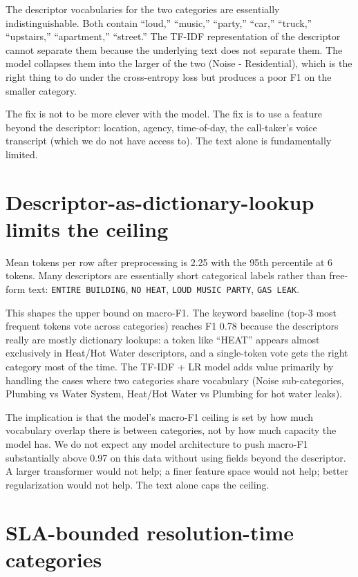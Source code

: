 \documentclass[11pt,letterpaper]{book}
\begin{document}
The descriptor vocabularies for the two categories are essentially indistinguishable. Both contain ``loud,'' ``music,'' ``party,'' ``car,'' ``truck,'' ``upstairs,'' ``apartment,'' ``street.'' The TF-IDF representation of the descriptor cannot separate them because the underlying text does not separate them. The model collapses them into the larger of the two (Noise - Residential), which is the right thing to do under the cross-entropy loss but produces a poor F1 on the smaller category.

The fix is not to be more clever with the model. The fix is to use a feature beyond the descriptor: location, agency, time-of-day, the call-taker's voice transcript (which we do not have access to). The text alone is fundamentally limited.

\section{Descriptor-as-dictionary-lookup limits the ceiling}

Mean tokens per row after preprocessing is 2.25 with the 95th percentile at 6 tokens. Many descriptors are essentially short categorical labels rather than free-form text: \texttt{ENTIRE BUILDING}, \texttt{NO HEAT}, \texttt{LOUD MUSIC PARTY}, \texttt{GAS LEAK}.

This shapes the upper bound on macro-F1. The keyword baseline (top-3 most frequent tokens vote across categories) reaches F1 0.78 because the descriptors really are mostly dictionary lookups: a token like ``HEAT'' appears almost exclusively in Heat/Hot Water descriptors, and a single-token vote gets the right category most of the time. The TF-IDF + LR model adds value primarily by handling the cases where two categories share vocabulary (Noise sub-categories, Plumbing vs Water System, Heat/Hot Water vs Plumbing for hot water leaks).

The implication is that the model's macro-F1 ceiling is set by how much vocabulary overlap there is between categories, not by how much capacity the model has. We do not expect any model architecture to push macro-F1 substantially above 0.97 on this data without using fields beyond the descriptor. A larger transformer would not help; a finer feature space would not help; better regularization would not help. The text alone caps the ceiling.

\section{SLA-bounded resolution-time categories}
\end{document}
